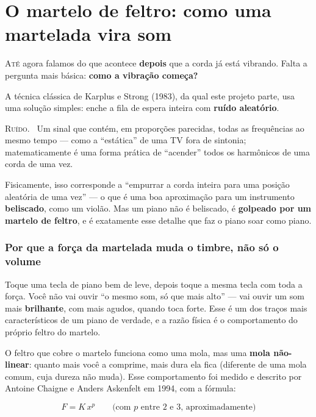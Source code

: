 \documentclass[11pt,oneside]{book}
\newcommand{\nova}[1]{\textsc{\color{accent}#1.}~}
\newcommand{\opening}[2]{\lettrine[lines=2,loversize=0.08,lraise=0.02]{#1}{#2}}
\begin{document}
\chapter{O martelo de feltro: como uma martelada vira som}

\opening{A}{té} agora falamos do que acontece \textbf{depois} que a corda
já está vibrando. Falta a pergunta mais básica: \textbf{como a vibração
começa?}

A técnica clássica de Karplus e Strong (1983), da qual este projeto parte,
usa uma solução simples: enche a fila de espera inteira com \textbf{ruído
aleatório}.

\begin{newword}
\nova{Ruído} Um sinal que contém, em proporções parecidas, todas as
frequências ao mesmo tempo --- como a \enquote{estática} de uma TV fora de
sintonia; matematicamente é uma forma prática de \enquote{acender} todos os
harmônicos de uma corda de uma vez.
\end{newword}

Fisicamente, isso corresponde a \enquote{empurrar a corda inteira para uma
posição aleatória de uma vez} --- o que é uma boa aproximação para um
instrumento \textbf{beliscado}, como um violão. Mas um piano não é
beliscado, é \textbf{golpeado por um martelo de feltro}, e é exatamente
esse detalhe que faz o piano soar como piano.

\subsection*{Por que a força da martelada muda o timbre, não só o volume}

Toque uma tecla de piano bem de leve, depois toque a mesma tecla com toda
a força. Você não vai ouvir \enquote{o mesmo som, só que mais alto} --- vai
ouvir um som mais \textbf{brilhante}, com mais agudos, quando toca forte.
Esse é um dos traços mais característicos de um piano de verdade, e a razão
física é o comportamento do próprio feltro do martelo.

O feltro que cobre o martelo funciona como uma mola, mas uma \textbf{mola
não-linear}: quanto mais você a comprime, mais dura ela fica (diferente de
uma mola comum, cuja dureza não muda). Esse comportamento foi medido e
descrito por Antoine Chaigne e Anders Askenfelt em 1994, com a fórmula:

\[
F = K \, x^{p} \qquad \text{(com } p \text{ entre 2 e 3, aproximadamente)}
\]
\end{document}

